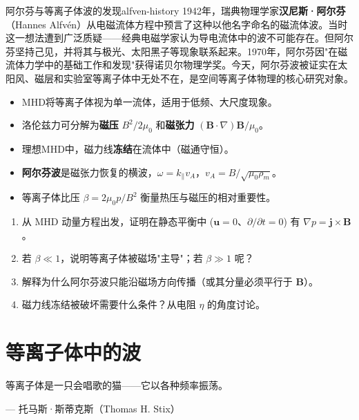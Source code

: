 \documentclass[12pt,a4paper,openany,oneside]{book}
\newcommand{\vect}[1]{\bm{#1}}
\newcommand{\grad}{\nabla}
\begin{document}
\begin{history}{阿尔芬与等离子体波的发现}{alfven-history}
1942年，瑞典物理学家\textbf{汉尼斯·阿尔芬}（Hannes Alfv\'{e}n）从电磁流体方程中预言了这种以他名字命名的磁流体波。当时这一想法遭到广泛质疑——经典电磁学家认为导电流体中的波不可能存在。但阿尔芬坚持己见，并将其与极光、太阳黑子等现象联系起来。1970年，阿尔芬因"在磁流体力学中的基础工作和发现"获得诺贝尔物理学奖。今天，阿尔芬波被证实在太阳风、磁层和实验室等离子体中无处不在，是空间等离子体物理的核心研究对象。
\end{history}

\begin{chapterreview}
\begin{itemize}
\item MHD将等离子体视为单一流体，适用于低频、大尺度现象。
\item 洛伦兹力可分解为\textbf{磁压} $B^2/2\mu_0$ 和\textbf{磁张力} $(\vect{B}\cdot\grad)\vect{B}/\mu_0$。
\item 理想MHD中，磁力线\textbf{冻结}在流体中（磁通守恒）。
\item \textbf{阿尔芬波}是磁张力恢复的横波，$\omega = k_\parallel v_A$，$v_A = B/\sqrt{\mu_0\rho_m}$。
\item 等离子体比压 $\beta = 2\mu_0 p/B^2$ 衡量热压与磁压的相对重要性。
\end{itemize}
\end{chapterreview}

\begin{miniquiz}
\begin{enumerate}
\item 从 MHD 动量方程出发，证明在静态平衡中 ($\vect{u}=0$、$\partial/\partial t=0$) 有 $\grad p = \vect{j}\times\vect{B}$。
\item 若 $\beta \ll 1$，说明等离子体被磁场"主导"；若 $\beta \gg 1$ 呢？
\item 解释为什么阿尔芬波只能沿磁场方向传播（或其分量必须平行于 $\vect{B}$）。
\item 磁力线冻结被破坏需要什么条件？从电阻 $\eta$ 的角度讨论。
\end{enumerate}
\end{miniquiz}




\chapter{等离子体中的波}\label{ch:6}
\epigraph{等离子体是一只会唱歌的猫——它以各种频率振荡。}{--- 托马斯·斯蒂克斯（Thomas H. Stix）}
\end{document}
